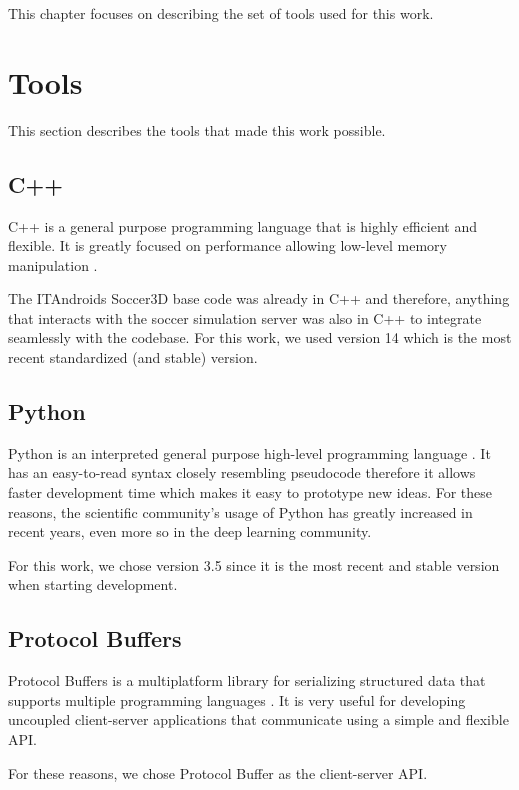 This chapter focuses on describing the set of tools used for this work.



\section{Tools}

This section describes the tools that made this work possible.

\subsection{C++}

C++ is a general purpose programming language that is highly efficient and flexible.
It is greatly focused on performance allowing low-level memory manipulation \cite{C++}.

The ITAndroids Soccer3D base code was already in C++ and therefore, anything that interacts with the soccer simulation server
was also in C++ to integrate seamlessly with the codebase.
For this work, we used version 14 which is the most recent standardized (and stable) version.

\subsection{Python}

Python is an interpreted general purpose high-level programming language \cite{Python}. It has an easy-to-read syntax
closely resembling pseudocode therefore it allows faster development time which makes it easy to prototype new ideas.
For these reasons, the scientific community's usage of Python has greatly increased in recent years, even more so in the
deep learning community. 

For this work, we chose version 3.5 since it is the most recent and stable version when starting development.


\subsection{Protocol Buffers}

Protocol Buffers is a multiplatform library for serializing structured data that supports multiple programming languages \cite{ProtoBuf}.
It is very useful for developing uncoupled client-server applications that communicate using a simple and flexible API.

For these reasons, we chose Protocol Buffer as the client-server API.

